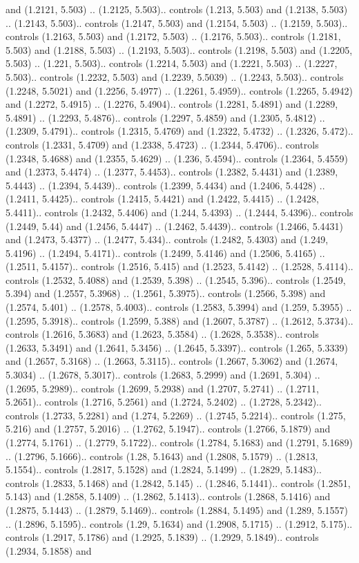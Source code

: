 and (1.2121, 5.503) .. (1.2125, 5.503).. controls (1.213, 5.503) and (1.2138, 5.503) .. (1.2143, 5.503).. controls (1.2147, 5.503) and (1.2154, 5.503) .. (1.2159, 5.503).. controls (1.2163, 5.503) and (1.2172, 5.503) .. (1.2176, 5.503).. controls (1.2181, 5.503) and (1.2188, 5.503) .. (1.2193, 5.503).. controls (1.2198, 5.503) and (1.2205, 5.503) .. (1.221, 5.503).. controls (1.2214, 5.503) and (1.2221, 5.503) .. (1.2227, 5.503).. controls (1.2232, 5.503) and (1.2239, 5.5039) .. (1.2243, 5.503).. controls (1.2248, 5.5021) and (1.2256, 5.4977) .. (1.2261, 5.4959).. controls (1.2265, 5.4942) and (1.2272, 5.4915) .. (1.2276, 5.4904).. controls (1.2281, 5.4891) and (1.2289, 5.4891) .. (1.2293, 5.4876).. controls (1.2297, 5.4859) and (1.2305, 5.4812) .. (1.2309, 5.4791).. controls (1.2315, 5.4769) and (1.2322, 5.4732) .. (1.2326, 5.472).. controls (1.2331, 5.4709) and (1.2338, 5.4723) .. (1.2344, 5.4706).. controls (1.2348, 5.4688) and (1.2355, 5.4629) .. (1.236, 5.4594).. controls (1.2364, 5.4559) and (1.2373, 5.4474) .. (1.2377, 5.4453).. controls (1.2382, 5.4431) and (1.2389, 5.4443) .. (1.2394, 5.4439).. controls (1.2399, 5.4434) and (1.2406, 5.4428) .. (1.2411, 5.4425).. controls (1.2415, 5.4421) and (1.2422, 5.4415) .. (1.2428, 5.4411).. controls (1.2432, 5.4406) and (1.244, 5.4393) .. (1.2444, 5.4396).. controls (1.2449, 5.44) and (1.2456, 5.4447) .. (1.2462, 5.4439).. controls (1.2466, 5.4431) and (1.2473, 5.4377) .. (1.2477, 5.434).. controls (1.2482, 5.4303) and (1.249, 5.4196) .. (1.2494, 5.4171).. controls (1.2499, 5.4146) and (1.2506, 5.4165) .. (1.2511, 5.4157).. controls (1.2516, 5.415) and (1.2523, 5.4142) .. (1.2528, 5.4114).. controls (1.2532, 5.4088) and (1.2539, 5.398) .. (1.2545, 5.396).. controls (1.2549, 5.394) and (1.2557, 5.3968) .. (1.2561, 5.3975).. controls (1.2566, 5.398) and (1.2574, 5.401) .. (1.2578, 5.4003).. controls (1.2583, 5.3994) and (1.259, 5.3955) .. (1.2595, 5.3918).. controls (1.2599, 5.388) and (1.2607, 5.3787) .. (1.2612, 5.3734).. controls (1.2616, 5.3683) and (1.2623, 5.3584) .. (1.2628, 5.3538).. controls (1.2633, 5.3491) and (1.2641, 5.3456) .. (1.2645, 5.3397).. controls (1.265, 5.3339) and (1.2657, 5.3168) .. (1.2663, 5.3115).. controls (1.2667, 5.3062) and (1.2674, 5.3034) .. (1.2678, 5.3017).. controls (1.2683, 5.2999) and (1.2691, 5.304) .. (1.2695, 5.2989).. controls (1.2699, 5.2938) and (1.2707, 5.2741) .. (1.2711, 5.2651).. controls (1.2716, 5.2561) and (1.2724, 5.2402) .. (1.2728, 5.2342).. controls (1.2733, 5.2281) and (1.274, 5.2269) .. (1.2745, 5.2214).. controls (1.275, 5.216) and (1.2757, 5.2016) .. (1.2762, 5.1947).. controls (1.2766, 5.1879) and (1.2774, 5.1761) .. (1.2779, 5.1722).. controls (1.2784, 5.1683) and (1.2791, 5.1689) .. (1.2796, 5.1666).. controls (1.28, 5.1643) and (1.2808, 5.1579) .. (1.2813, 5.1554).. controls (1.2817, 5.1528) and (1.2824, 5.1499) .. (1.2829, 5.1483).. controls (1.2833, 5.1468) and (1.2842, 5.145) .. (1.2846, 5.1441).. controls (1.2851, 5.143) and (1.2858, 5.1409) .. (1.2862, 5.1413).. controls (1.2868, 5.1416) and (1.2875, 5.1443) .. (1.2879, 5.1469).. controls (1.2884, 5.1495) and (1.289, 5.1557) .. (1.2896, 5.1595).. controls (1.29, 5.1634) and (1.2908, 5.1715) .. (1.2912, 5.175).. controls (1.2917, 5.1786) and (1.2925, 5.1839) .. (1.2929, 5.1849).. controls (1.2934, 5.1858) and 